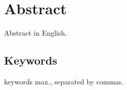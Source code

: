 
\chapter*{Abstract}

Abstract in English.


\section*{Keywords}

 keywords max., separated by commas.



